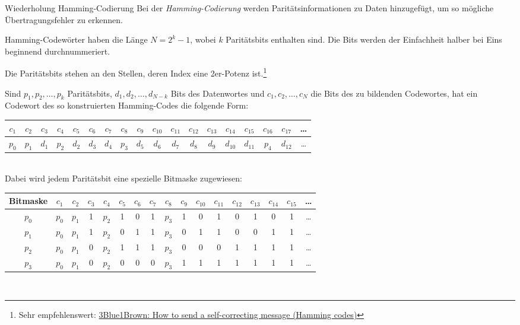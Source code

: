 \begin{defi}{Wiederholung Hamming-Codierung}
    Bei der \emph{Hamming-Codierung} werden Paritätsinformationen zu Daten hinzugefügt, um so mögliche Übertragungsfehler zu erkennen.

    Hamming-Codewörter haben die Länge $N = 2^k-1$, wobei $k$ Paritätsbits enthalten sind.
    Die Bits werden der Einfachheit halber bei Eins beginnend durchnummeriert.

    Die Paritätsbits stehen an den Stellen, deren Index eine 2er-Potenz ist.\footnote{Sehr empfehlenswert: \href{https://youtu.be/X8jsijhllIA}{3Blue1Brown: How to send a self-correcting message (Hamming codes)}}

    Sind $p_1, p_2, \ldots, p_k$ Paritätsbits, $d_1, d_2, \ldots, d_{N-k}$ Bits des Datenwortes und $c_1, c_2, \ldots, c_N$ die Bits des zu bildenden Codewortes, hat ein Codewort des so konstruierten Hamming-Codes die folgende Form:

    \begin{tabular}{| c | c | c || c | c | c | c || c | c | c | c | c | c | c | c || c | c | c |}
        \hline
        $c_1$ & $c_2$ & $c_3$ & $c_4$ & $c_5$ & $c_6$ & $c_7$ & $c_8$ & $c_9$ & $c_{10}$ & $c_{11}$ & $c_{12}$ & $c_{13}$ & $c_{14}$ & $c_{15}$ & $c_{16}$ & $c_{17}$ & \ldots \\
        \hline
        \hline
        $p_0$ & $p_1$ & $d_1$ & $p_2$ & $d_2$ & $d_3$ & $d_4$ & $p_3$ & $d_5$ & $d_6$    & $d_7$    & $d_8$    & $d_9$    & $d_{10}$ & $d_{11}$ & $p_4$    & $d_{12}$ & \ldots \\
        \hline
    \end{tabular}\\

    Dabei wird jedem Paritätsbit eine spezielle Bitmaske zugewiesen:

    \begin{tabular}{| c || c | c | c || c | c | c | c || c | c | c | c | c | c | c | c || c |}
        \hline
        Bitmaske & $c_1$ & $c_2$ & $c_3$ & $c_4$ & $c_5$ & $c_6$ & $c_7$ & $c_8$ & $c_9$ & $c_{10}$ & $c_{11}$ & $c_{12}$ & $c_{13}$ & $c_{14}$ & $c_{15}$ & \ldots \\
        \hline
        \hline
        $p_0$    & $p_0$ & $p_1$ & 1     & $p_2$ & 1     & 0     & 1     & $p_3$ & 1     & 0        & 1        & 0        & 1        & 0        & 1        & \ldots \\
        $p_1$    & $p_0$ & $p_1$ & 1     & $p_2$ & 0     & 1     & 1     & $p_3$ & 0     & 1        & 1        & 0        & 0        & 1        & 1        & \ldots \\
        $p_2$    & $p_0$ & $p_1$ & 0     & $p_2$ & 1     & 1     & 1     & $p_3$ & 0     & 0        & 0        & 1        & 1        & 1        & 1        & \ldots \\
        $p_3$    & $p_0$ & $p_1$ & 0     & $p_2$ & 0     & 0     & 0     & $p_3$ & 1     & 1        & 1        & 1        & 1        & 1        & 1        & \ldots \\
        \hline
    \end{tabular}\\


\end{defi}

